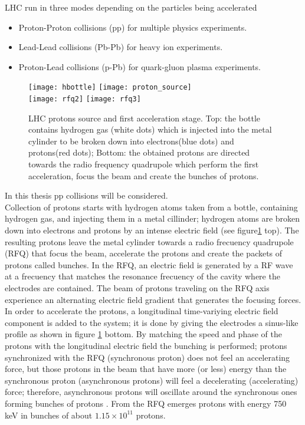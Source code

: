 \noindent LHC run in three modes depending on the particles being accelerated

\begin{itemize}
\item Proton-Proton collisions (pp) for multiple physics experiments.
\item Lead-Lead collisions (Pb-Pb) for heavy ion experiments. 
\item Proton-Lead collisions (p-Pb) for quark-gluon plasma experiments.
\end{itemize}

\begin{figure}[!h]
\centering
\texttt{[image: hbottle]}
\texttt{[image: proton\_source]}\\
\texttt{[image: rfq2]}
\texttt{[image: rfq3]}
\caption[LHC protons source and first acceleration stage.]{LHC protons source and first acceleration stage. Top: the bottle contains hydrogen gas (white dots) which is injected into the metal cylinder to be broken down into electrons(blue dots) and protons(red dots); Bottom: the obtained protons are directed towards the radio frequency quadrupole which perform the first acceleration, focus the beam and create the bunches of protons.\cite{rfq2,video}}\label{fig:hbottle}
\end{figure}

\noindent In this thesis pp collisions will be considered.\\

\noindent Collection of protons starts with hydrogen atoms taken from a bottle, containing hydrogen gas, and injecting them in a metal cillinder; hydrogen atoms are broken down into electrons and protons by an intense electric field (see figure\ref{fig:hbottle} top). The resulting protons leave the metal cylinder towards a radio frecuency quadrupole (RFQ) that focus the beam, accelerate the protons and create the packets of protons called bunches. In the RFQ, an electric field is generated by a RF wave at a frecuency that matches the resonance frecuency of the cavity where the electrodes are contained. The beam of protons traveling on the RFQ axis experience an alternating electric field gradient that generates the focusing forces.\\

\noindent In order to accelerate the protons, a longitudinal time-variying electric field component is added to the system; it is done by giving the electrodes a sinus-like profile as shown in figure \ref{fig:hbottle} bottom. By matching the speed and phase of the protons with the longitudinal electric field the bunching is performed; protons synchronized with the RFQ (synchronous proton) does not feel an accelerating force, but those protons in the beam that have more (or less) energy than the synchronous proton (asynchronous protons) will feel a decelerating (accelerating) force; therefore, asynchronous protons will oscillate around the synchronous ones forming bunches of protons \cite{rfq}. From the RFQ emerges protons with energy 750 keV in bunches of about $1.15 \times 10^{11}$ protons\cite{lyndon}.        

